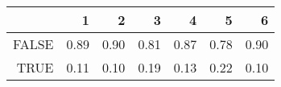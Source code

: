 \begin{table}[ht]
\centering
\begin{tabular}{rrrrrrr}
  \hline
 & 1 & 2 & 3 & 4 & 5 & 6 \\ 
  \hline
FALSE & 0.89 & 0.90 & 0.81 & 0.87 & 0.78 & 0.90 \\ 
  TRUE & 0.11 & 0.10 & 0.19 & 0.13 & 0.22 & 0.10 \\ 
   \hline
\end{tabular}
\end{table}
